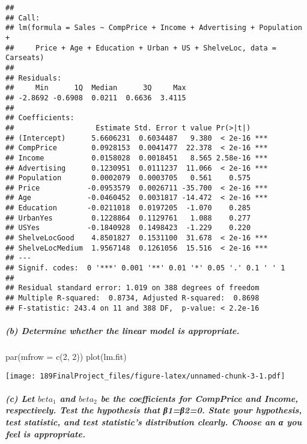 \documentclass[
]{article}
\newenvironment{Shaded}{\begin{snugshade}}{\end{snugshade}}
\newcommand{\AttributeTok}[1]{\textcolor[rgb]{0.77,0.63,0.00}{#1}}
\newcommand{\DecValTok}[1]{\textcolor[rgb]{0.00,0.00,0.81}{#1}}
\newcommand{\FunctionTok}[1]{\textcolor[rgb]{0.00,0.00,0.00}{#1}}
\newcommand{\NormalTok}[1]{#1}
\begin{document}
\begin{verbatim}
## 
## Call:
## lm(formula = Sales ~ CompPrice + Income + Advertising + Population + 
##     Price + Age + Education + Urban + US + ShelveLoc, data = Carseats)
## 
## Residuals:
##     Min      1Q  Median      3Q     Max 
## -2.8692 -0.6908  0.0211  0.6636  3.4115 
## 
## Coefficients:
##                   Estimate Std. Error t value Pr(>|t|)    
## (Intercept)      5.6606231  0.6034487   9.380  < 2e-16 ***
## CompPrice        0.0928153  0.0041477  22.378  < 2e-16 ***
## Income           0.0158028  0.0018451   8.565 2.58e-16 ***
## Advertising      0.1230951  0.0111237  11.066  < 2e-16 ***
## Population       0.0002079  0.0003705   0.561    0.575    
## Price           -0.0953579  0.0026711 -35.700  < 2e-16 ***
## Age             -0.0460452  0.0031817 -14.472  < 2e-16 ***
## Education       -0.0211018  0.0197205  -1.070    0.285    
## UrbanYes         0.1228864  0.1129761   1.088    0.277    
## USYes           -0.1840928  0.1498423  -1.229    0.220    
## ShelveLocGood    4.8501827  0.1531100  31.678  < 2e-16 ***
## ShelveLocMedium  1.9567148  0.1261056  15.516  < 2e-16 ***
## ---
## Signif. codes:  0 '***' 0.001 '**' 0.01 '*' 0.05 '.' 0.1 ' ' 1
## 
## Residual standard error: 1.019 on 388 degrees of freedom
## Multiple R-squared:  0.8734, Adjusted R-squared:  0.8698 
## F-statistic: 243.4 on 11 and 388 DF,  p-value: < 2.2e-16
\end{verbatim}

\hypertarget{b-determine-whether-the-linear-model-is-appropriate.}{%
\subparagraph{(b) Determine whether the linear model is
appropriate.}\label{b-determine-whether-the-linear-model-is-appropriate.}}

\begin{Shaded}
\begin{Highlighting}[]
\FunctionTok{par}\NormalTok{(}\AttributeTok{mfrow =} \FunctionTok{c}\NormalTok{(}\DecValTok{2}\NormalTok{, }\DecValTok{2}\NormalTok{))}
\FunctionTok{plot}\NormalTok{(lm.fit)}
\end{Highlighting}
\end{Shaded}

\texttt{[image: 189FinalProject\_files/figure-latex/unnamed-chunk-3-1.pdf]}

\hypertarget{c-let-beta_1-and-beta_2-be-the-coefficients-for-compprice-and-income-respectively.-test-the-hypothesis-that-ux3b21ux3b220.-state-your-hypothesis-test-statistic-and-test-statistics-distribution-clearly.-choose-an-ux3b1-you-feel-is-appropriate.}{%
\subparagraph{\texorpdfstring{(c) Let \(beta_1\) and \(beta_2\) be the
coefficients for CompPrice and Income, respectively. Test the hypothesis
that β1=β2=0. State your hypothesis, test statistic, and test
statistic's distribution clearly. Choose an α you feel is
appropriate.}{(c) Let beta\_1 and beta\_2 be the coefficients for CompPrice and Income, respectively. Test the hypothesis that β1=β2=0. State your hypothesis, test statistic, and test statistic's distribution clearly. Choose an α you feel is appropriate.}}\label{c-let-beta_1-and-beta_2-be-the-coefficients-for-compprice-and-income-respectively.-test-the-hypothesis-that-ux3b21ux3b220.-state-your-hypothesis-test-statistic-and-test-statistics-distribution-clearly.-choose-an-ux3b1-you-feel-is-appropriate.}}
\end{document}

